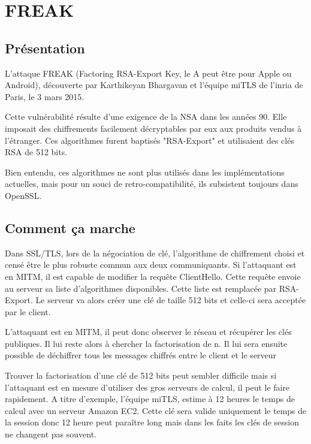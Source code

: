 \chapter{FREAK}
\label{chap:freak}

\section{Présentation}
\label{sec:pFreak}

L'attaque FREAK (Factoring RSA-Export Key, le A peut être pour Apple ou Android), découverte
par Karthikeyan Bhargavan et l'équipe miTLS de l'inria de Paris, le 3 mars 2015.


Cette vulnérabilité résulte d'une exigence de la NSA dans les années 90. Elle imposait des chiffrements
facilement décryptables par eux aux produits vendus à l'étranger.
Ces algorithmes furent baptisés "RSA-Export" et utilisaient des clés RSA de 512 bits.


Bien entendu, ces algorithmes ne sont plus utilisés dans les implémentations actuelles, mais pour un souci de retro-compatibilité, ils subsistent toujours dans OpenSSL.

\section{Comment ça marche}
\label{sec:ccmFreak}

Dans SSL/TLS, lors de la négociation de clé, l'algorithme de chiffrement choisi et censé être le plus
robuste commun aux deux communiquants. Si l'attaquant est en MITM, il est capable de modifier la requête ClientHello.
Cette requête envoie au serveur sa liste d'algorithmes disponibles. Cette liste est remplacée par RSA-Export. Le serveur
va alors créer une clé de taille 512 bits et celle-ci sera acceptée par le client.

L'attaquant est en MITM, il peut donc observer le réseau et récupérer les clés publiques. Il lui reste alors à 
chercher la factorisation de n. Il lui sera ensuite possible de déchiffrer tous les messages chiffrés entre le
client et le serveur

Trouver la factorisation d'une clé de 512 bits peut sembler difficile mais si l'attaquant est en mesure d'utiliser
des gros serveurs de calcul, il peut le faire rapidement. A titre d'exemple, l'équipe miTLS, estime à 12 heures le temps de calcul avec un serveur Amazon EC2. Cette clé sera valide uniquement le temps de la session donc 12 heure 
peut paraître long mais dans les faits les clés de session ne changent pas souvent.

